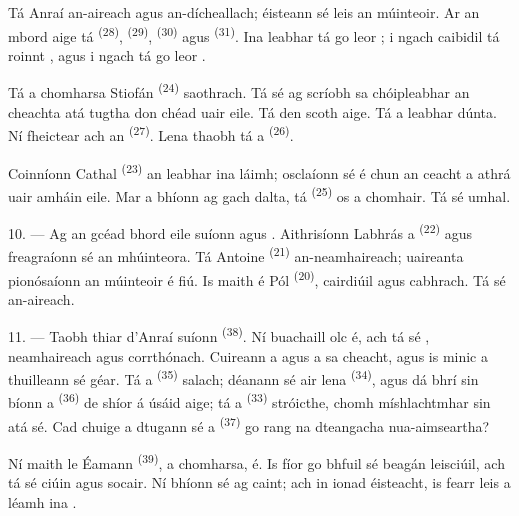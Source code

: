 Tá Anraí an-aireach agus an-dícheallach; éisteann sé leis an múinteoir. Ar an
mbord aige tá  \textsuperscript{(28)}, 
\textsuperscript{(29)},  \textsuperscript{(30)} agus  \textsuperscript{(31)}. Ina leabhar tá go leor ;
i ngach caibidil tá roinnt , agus i ngach  tá go leor
.

Tá a chomharsa Stiofán \textsuperscript{(24)} saothrach. Tá sé ag scríobh sa
chóipleabhar an cheachta atá tugtha don chéad uair eile. Tá  den scoth aige. Tá a leabhar dúnta. Ní fheictear ach an
 \textsuperscript{(27)}. Lena thaobh tá a 
\textsuperscript{(26)}.

Coinníonn Cathal \textsuperscript{(23)} an leabhar ina láimh; osclaíonn sé é chun
an ceacht a athrá uair amháin eile. Mar a bhíonn ag gach dalta, tá
 \textsuperscript{(25)} os a chomhair. Tá sé umhal.

10. --- Ag an gcéad bhord eile suíonn  agus
. Aithrisíonn Labhrás a  \textsuperscript{(22)} agus
freagraíonn sé  an mhúinteora. Tá Antoine
\textsuperscript{(21)} an-neamhaireach; uaireanta pionósaíonn an múinteoir é fiú. Is
 maith é Pól \textsuperscript{(20)}, cairdiúil agus cabhrach. Tá
sé an-aireach.

\VUsaut{4.2mm}
\VUsaut{3.2mm}

11. --- Taobh thiar d'Anraí suíonn  \textsuperscript{(38)}. Ní
buachaill olc é, ach tá sé , neamhaireach agus corrthónach.
Cuireann a  agus a 
 sa cheacht, agus is minic a thuilleann sé
 géar. Tá a  \textsuperscript{(35)} salach;
déanann sé  air lena 
\textsuperscript{(34)}, agus dá bhrí sin bíonn a 
\textsuperscript{(36)} de shíor á úsáid aige; tá a 
\textsuperscript{(33)} stróicthe, chomh míshlachtmhar sin atá sé. Cad chuige a
dtugann sé a  \textsuperscript{(37)} go rang na dteangacha
nua-aimseartha?

Ní maith le Éamann \textsuperscript{(39)}, a chomharsa, é. Is fíor go bhfuil sé
beagán leisciúil, ach tá sé ciúin agus socair. Ní bhíonn sé ag caint; ach in ionad
éisteacht, is fearr leis  a léamh ina .

